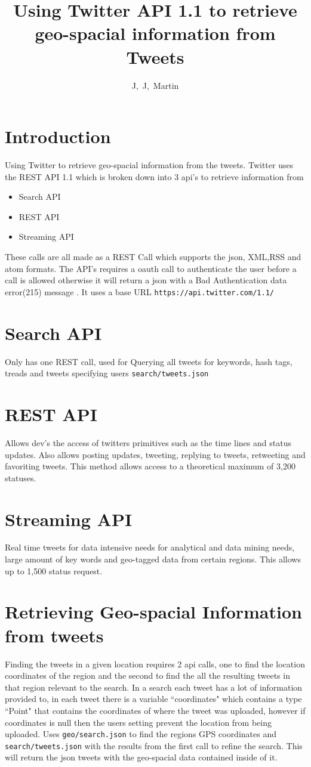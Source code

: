 \documentclass{article}
\title{Using Twitter API 1.1 to retrieve geo-spacial information from Tweets}
\author{J,\ J,\ Martin}
\begin{document}
\maketitle
\section{Introduction}
Using Twitter to retrieve geo-spacial information from the tweets. Twitter uses the REST API 1.1 which is broken down into 3 api's to retrieve information from 
\begin{itemize}
\item Search API
\item REST API
\item Streaming API

\end{itemize}

These calls are all made as a REST Call which supports the json, XML,RSS and atom formats. The API's requires a oauth call to authenticate the user before a call is allowed otherwise it will return a json with a Bad Authentication data error(215) message . It uses a base URL \verb+https://api.twitter.com/1.1/+
\section{Search API}
Only has one REST call, used for Querying all tweets for keywords, hash tags, treads and tweets specifying users \verb+search/tweets.json+
\section{REST API}
Allows dev's the access of twitters primitives such as the time lines and status updates. Also allows posting updates, tweeting, replying to tweets, retweeting and favoriting tweets. 
This method allows access to a theoretical maximum of 3,200 statuses.

\section{Streaming API}
Real time tweets for data intensive needs for analytical and data mining needs, large amount of key words and geo-tagged data from certain regions.
This allows up to 1,500  status request. 

\section{Retrieving Geo-spacial Information from tweets}
Finding the tweets in a given location requires 2 api calls, one to find the location coordinates of the region and the second to find the all the resulting tweets in that region relevant to the search. In a search each tweet has a lot of information provided to, in each tweet there is a variable ``coordinates" which contains a type ``Point" that contains the coordinates of where the tweet was uploaded, however if coordinates is null then the users setting prevent the location from being uploaded.
Uses \verb+geo/search.json+ to find the regions GPS coordinates and \verb+search/tweets.json+ with the results from the first call to refine the search. This will return the json tweets with the geo-spacial data contained inside of it.
\end{document}
